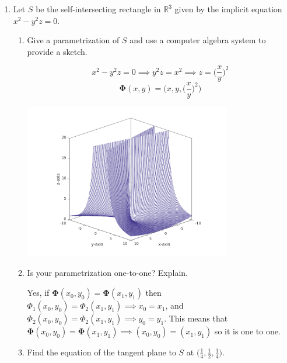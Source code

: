 \documentclass{article}
\begin{document}
\begin{enumerate}
    \newpage

    \item Let $S$ be the self-intersecting rectangle in $\mathbb{R}^3$ given by the implicit equation $x^2-y^2z=0.$
        \begin{enumerate}
            \item Give a parametrization of $S$ and use a computer algebra system to provide a sketch.

            \[x^2 - y^2z = 0 \implies y^2z = x^2 \implies z = \bigg(\frac{x}{y}\bigg)^2\]
            \[\boldsymbol \Phi (x,y) = \Bigg(x, y, \bigg(\frac{x}{y}\bigg)^2\Bigg)\]

            \includegraphics[width=0.75\textwidth,center]{b42-a8-3a}
            
            \item Is your parametrization one-to-one? Explain.

            Yes, if $\boldsymbol \Phi (x_0,y_0) = \boldsymbol \Phi (x_1,y_1)$ then $\Phi_1(x_0,y_0) = \Phi_2(x_1,y_1) \implies x_0 = x_1$, and $\Phi_2(x_0,y_0) = \Phi_2(x_1,y_1) \implies y_0 = y_1$. This means that $\boldsymbol \Phi (x_0, y_0) = \boldsymbol \Phi (x_1, y_1) \implies (x_0, y_0) = (x_1, y_1)$ so it is one to one.
            
            \item Find the equation of the tangent plane to $S$ at $\displaystyle \bigg( \frac{1}{4}, \frac{1}{2}, \frac{1}{4} \bigg).$


\end{enumerate}
\end{enumerate}
\end{document}
